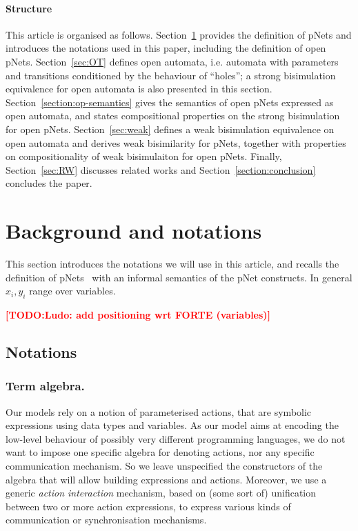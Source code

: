 \documentclass{lmcs}
\newcommand{\TODO}[1]{\textcolor{red}{\textbf{[TODO:#1]}}}
\begin{document}
\paragraph{Structure}
This article is organised as follows. Section~\ref{sec:notations}
provides the definition of pNets and introduces the notations used in
this paper, including the definition of open pNets. 
Section~\ref{sec:OT} defines open automata, i.e. automata
with parameters and transitions conditioned by the behaviour of
``holes''; a strong bisimulation equivalence for open automata is also
presented in this section. 
Section~\ref{section:op-semantics} gives
the semantics of open pNets expressed as open automata, and states
compositional properties on the strong bisimulation for open
pNets. 
Section~\ref{sec:weak} defines a weak bisimulation
equivalence on open automata and derives weak bisimilarity for pNets,
together with properties on compositionality of weak bisimulaiton for
open pNets. 
Finally, Section~\ref{sec:RW} discusses related works and Section~\ref{section:conclusion} concludes the
paper. 


\section{Background and notations}\label{sec:notations}
This section introduces the notations we will use in this article, and  recalls the definition of pNets~\cite{henrio:Forte2016} with an informal semantics  of the pNet constructs.
In general $x_i,y_i$ range over variables.

\TODO{Ludo: add positioning wrt FORTE (variables)}


\subsection{Notations}
\subsubsection*{Term algebra.}
Our models rely on a notion of parameterised actions, that are
symbolic expressions using data types and variables. As our model aims
at encoding the low-level behaviour of possibly very different
programming languages, we do not want to impose one specific algebra
for denoting actions, nor any specific communication mechanism. So we
leave unspecified the constructors of the algebra that will allow building
expressions and actions. Moreover, we use a generic {\em action interaction}
mechanism, based on (some sort of) unification between two or more action
expressions, to express various kinds of communication or
synchronisation mechanisms.
\end{document}
